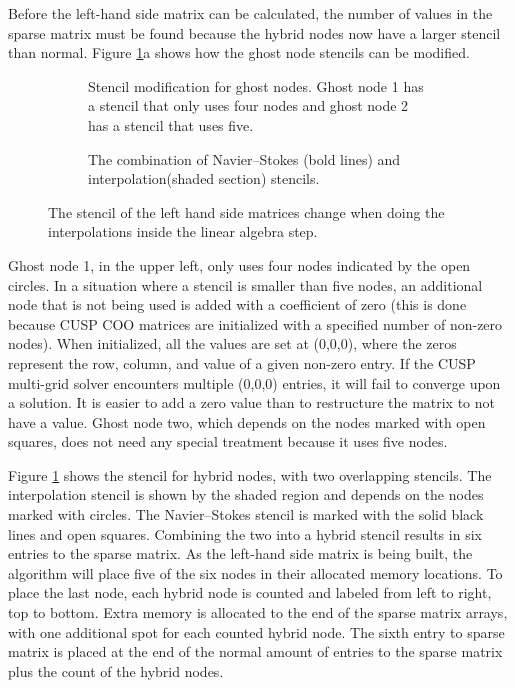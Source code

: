\documentclass[preprint,12pt,5p]{elsarticle}
\begin{document}
Before the left-hand side matrix can be calculated, the number of values in the sparse matrix must be found because the hybrid nodes now have a larger stencil than normal. 
Figure \ref{fig:ID combined stencil}a shows how the ghost node stencils can be modified. 
\begin{figure}[!htb]
	\centering
	\begin{subfigure}{0.5\textwidth}
		
		\caption{Stencil modification for ghost nodes. Ghost node 1 has a stencil that only uses four nodes and ghost node 2 has a stencil that uses five.}		
	\end{subfigure}
	
	\begin{subfigure}{0.5\textwidth}
		
		\caption{The combination of Navier--Stokes (bold lines) and interpolation(shaded section) stencils.}		
	\end{subfigure}
	\caption{The stencil of the left hand side matrices change when doing the interpolations inside the linear algebra step.}
	\label{fig:ID combined stencil}
\end{figure}
Ghost node 1, in the upper left, only uses four nodes indicated by the open circles. 
In a situation where a stencil is smaller than five nodes, an additional node that is not being used is added with a coefficient of zero (this is done because CUSP COO matrices are initialized with a specified number of non-zero nodes).
When initialized, all the values are set at (0,0,0), where the zeros represent the row, column, and value of a given non-zero entry.
If the CUSP multi-grid solver encounters multiple (0,0,0) entries, it will fail to converge upon a solution.
It is easier to add a zero value than to restructure the matrix to not have a value.
Ghost node two, which depends on the nodes marked with open squares, does not need any special treatment because it uses five nodes. 

Figure \ref{fig:ID combined stencil} shows the stencil for hybrid nodes, with two overlapping stencils. 
The interpolation stencil is shown by the shaded region and depends on the nodes marked with circles. 
The Navier--Stokes stencil is marked with the solid black lines and open squares.
Combining the two into a hybrid stencil results in six entries to the sparse matrix. 
As the left-hand side matrix is being built, the algorithm will place five of the six nodes in their allocated memory locations. 
To place the last node, each hybrid node is counted and labeled from left to right, top to bottom. 
Extra memory is allocated to the end of the sparse matrix arrays, with one additional spot for each counted hybrid node. 
The sixth entry to sparse matrix is placed at the end of the normal amount of entries to the sparse matrix plus the count of the hybrid nodes. 
\end{document}
